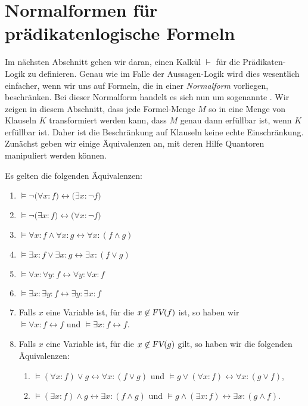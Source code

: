 \section{Normalformen für prädikatenlogische Formeln}
Im nächsten Abschnitt gehen wir daran, einen Kalkül $\vdash$ für die
Prädikaten-Logik zu definieren.  Genau wie im Falle der Aussagen-Logik wird dies wesentlich einfacher, wenn wir
uns auf Formeln, die in einer \emph{Normalform}  vorliegen, beschränken.  Bei dieser Normalform handelt es sich
nun um sogenannte .  Wir zeigen in diesem Abschnitt, dass jede Formel-Menge $M$
so in eine Menge von Klauseln $K$ transformiert werden kann, dass $M$ genau dann erfüllbar ist, wenn $K$
erfüllbar ist.  Daher ist die Beschränkung auf Klauseln keine echte Einschränkung.  Zunächst geben wir einige
Äquivalenzen an, mit deren Hilfe Quantoren manipuliert werden können. 

\begin{Satz}
  Es gelten die folgenden Äquivalenzen:
  \begin{enumerate}
  \item $\models \neg\big(\forall x\colon f\big) \leftrightarrow \big(\exists x\colon \neg f\big)$
  \item $\models \neg\big(\exists x\colon f\big) \leftrightarrow \big(\forall x\colon \neg f\big)$
  \item $\models \forall x\colon f \wedge \forall x\colon g \leftrightarrow \forall x\colon (f \wedge g)$
  \item $\models \exists x\colon f \vee \exists x\colon g \leftrightarrow \exists x\colon (f \vee g)$
  \item $\models \forall x\colon \forall y\colon f \leftrightarrow \forall y\colon  \forall x\colon f$
  \item $\models \exists x\colon \exists y\colon f \leftrightarrow \exists y\colon  \exists x\colon f$
  \item Falls $x$ eine Variable ist, für die $x \not\in \textsl{FV}(f)$ ist, so haben wir \\[0.2cm]
        \hspace*{1.3cm} $\models  \forall x\colon f \leftrightarrow f$ \quad und \quad
                        $\models  \exists x\colon f \leftrightarrow f$.
  \item Falls $x$ eine Variable ist, für die  $x \not\in \textsl{FV}(g)$ gilt, so haben wir die folgenden Äquivalenzen:
    \begin{enumerate}
    \item $\models (\forall x\colon f) \vee g \leftrightarrow \forall x\colon (f \vee g)$ \quad und \quad $\models g \vee (\forall x\colon f) \leftrightarrow \forall x\colon (g \vee f)$,
    \item $\models (\exists x\colon f) \wedge g \leftrightarrow \exists x\colon (f \wedge g)$ \quad und \quad $\models g \wedge (\exists x\colon f) \leftrightarrow \exists x\colon (g \wedge f)$.
    \end{enumerate}
  \end{enumerate}
\end{Satz}


